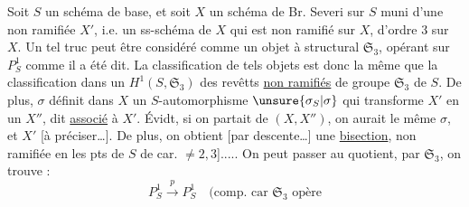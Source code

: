 Soit $S$ un schéma de base, et soit $X$ un schéma de Br. Severi sur $S$ muni d'une \uline{} non ramifiée $X'$, i.e. un ss-schéma  de $X$ qui est non ramifié sur $X$, d'ordre 3 sur $X$. Un tel truc peut être considéré comme un objet à  structural $\mathfrak S_3$, opérant sur $P^1_S$ comme il a été dit. La classification de tels objets est donc la même que la classification dans un $H^1(S,\mathfrak S_3)$ des revêtts  \uline{non ramifiés} de groupe $\mathfrak S_3$ de $S$. De plus, $\sigma$ définit dans $X$ un $S$-automorphisme   $\unsure{\sigma_S|\sigma}$ qui transforme $X'$ en un $X''$, dit \uline{associé} à $X'$. Évidt, si on partait de $(X,X'')$, on aurait le même $\sigma$, et  $X'$ [à préciser\ldots]. De plus, on obtient [par descente\ldots] une \uline{bisection}, non ramifiée \deleted{\unsure{[en ses points}} en les pts de $S$ de car. $\ne2,3$]..... On peut passer au quotient,  par $\mathfrak S_3$,  on trouve  :
\[
P^1_S\xrightarrow{p}P^1_S\quad\text{(comp. car }\mathfrak S_3\text{ opère}
\]
